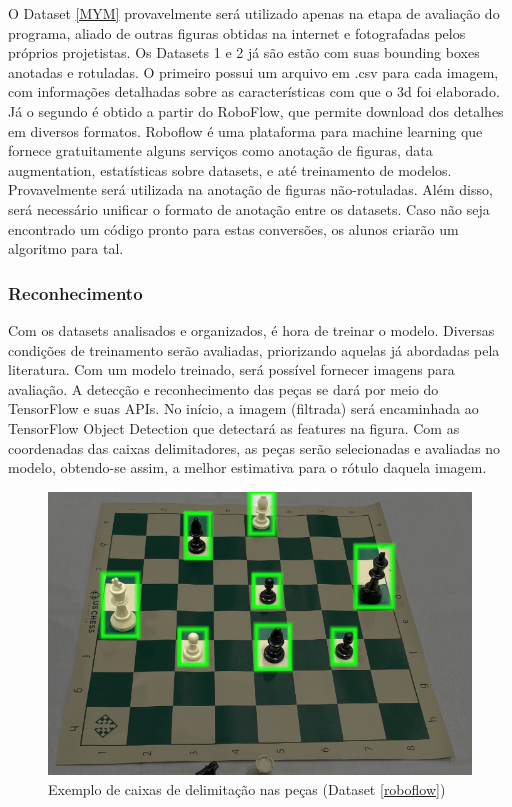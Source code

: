 \documentclass[a4paper,12pt,twoside]{article}
\begin{document}
O Dataset \ref{MYM} provavelmente será utilizado apenas na etapa de avaliação do programa,
aliado de outras figuras obtidas na internet e fotografadas pelos próprios projetistas.
Os Datasets 1 e 2 já são estão com suas bounding boxes anotadas e rotuladas.
O primeiro possui um arquivo em .csv para cada imagem,
com informações detalhadas sobre as características com que o 3d foi elaborado.
Já o segundo é obtido a partir do RoboFlow, que permite download dos detalhes em diversos formatos.
Roboflow é uma plataforma para machine learning que fornece gratuitamente alguns serviços como anotação de figuras,
data augmentation, estatísticas sobre datasets, e até treinamento de modelos.
Provavelmente será utilizada na anotação de figuras não-rotuladas.
Além disso, será necessário unificar o formato de anotação entre os datasets.
Caso não seja encontrado um código pronto para estas conversões, os alunos criarão um algoritmo para tal.

\subsubsection{Reconhecimento}

Com os datasets analisados e organizados, é hora de treinar o modelo.
Diversas condições de treinamento serão avaliadas, priorizando aquelas já abordadas pela literatura.
Com um modelo treinado, será possível fornecer imagens para avaliação.
A detecção e reconhecimento das peças se dará por meio do TensorFlow e suas APIs.
No início, a imagem (filtrada) será encaminhada ao TensorFlow Object Detection que detectará as features na figura.
Com as coordenadas das caixas delimitadores,
as peças serão selecionadas e avaliadas no modelo, obtendo-se assim, a melhor estimativa para o rótulo daquela imagem.

\begin{figure}[h!]
\centering
  \includegraphics[width=\linewidth]{fig/delimitar.jpg}
  \caption{Exemplo de caixas de delimitação nas peças (Dataset \ref{roboflow})}
\label{fig:delimitar}
\end{figure}
\end{document}
